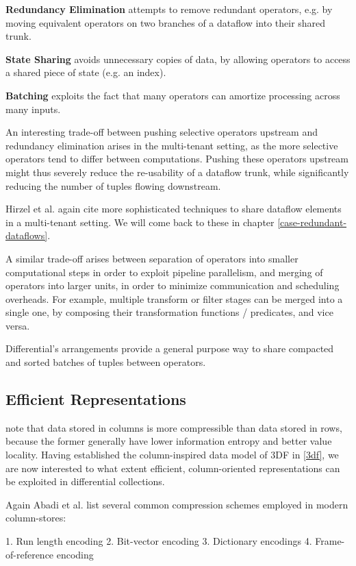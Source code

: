 \documentclass[../index.tex]{subfiles}
\begin{document}
\textbf{Redundancy Elimination} attempts to remove redundant operators,
e.g. by moving equivalent operators on two branches of a dataflow into
their shared trunk.

\textbf{State Sharing} avoids unnecessary copies of data, by allowing
operators to access a shared piece of state (e.g. an index).

\textbf{Batching} exploits the fact that many operators can amortize
processing across many inputs.

An interesting trade-off between pushing selective operators upstream
and redundancy elimination arises in the multi-tenant setting, as the
more selective operators tend to differ between computations. Pushing
these operators upstream might thus severely reduce the re-usability
of a dataflow trunk, while significantly reducing the number of tuples
flowing downstream. 

Hirzel et al. again cite more sophisticated techniques to share
dataflow elements in a multi-tenant setting. We will come back to
these in chapter \ref{case-redundant-dataflows}.

A similar trade-off arises between separation of operators into
smaller computational steps in order to exploit pipeline parallelism,
and merging of operators into larger units, in order to minimize
communication and scheduling overheads. For example, multiple
transform or filter stages can be merged into a single one, by
composing their transformation functions / predicates, and vice versa.

Differential's arrangements provide a general purpose way to share
compacted and sorted batches of tuples between operators.

\subsection{Efficient Representations}

\cite{abadi2013design} note that data stored in columns is more
compressible than data stored in rows, because the former generally
have lower information entropy and better value locality. Having
established the column-inspired data model of 3DF in \ref{3df}, we are
now interested to what extent efficient, column-oriented
representations can be exploited in differential collections.

Again Abadi et al. list several common compression schemes employed in
modern column-stores:

1. Run length encoding
2. Bit-vector encoding
3. Dictionary encodings
4. Frame-of-reference encoding
\end{document}
